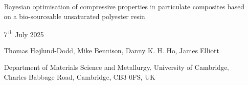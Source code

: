 \begin{flushleft}
    \LARGE{Bayesian optimisation of compressive properties in particulate
    composites based on a bio-sourceable unsaturated polyester resin}

    \vspace{0.5cm}
    \large{7\textsuperscript{th} July 2025}

    \vspace{0.25cm}
    \large{Thomas H{\o}jlund-Dodd, Mike Bennison, Danny K. H. Ho, James Elliott}

    \vspace{0.25cm}
    \footnotesize{Department of Materials Science and Metallurgy, University of Cambridge, Charles Babbage Road, Cambridge, CB3 0FS, UK}
\end{flushleft}